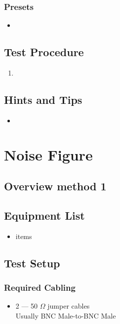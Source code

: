 \documentclass[10pt,letterpaper]{book}
\begin{document}
\subsubsection*{Presets}
\begin{itemize}
	\item
\end{itemize}
\subsection*{Test Procedure}
\begin{enumerate}
	\item  
\end{enumerate}

\subsection*{Hints and Tips}
\begin{itemize}
	\item
\end{itemize}


\section{Noise Figure}
\subsection*{Overview method 1}
\subsection*{Equipment List}
\begin{itemize}
	\item items
\end{itemize}
\subsection*{Test Setup}
\subsubsection*{Required Cabling}
\begin{itemize}
	\item 2 --- 50 $\Omega$ jumper cables \\
		Usually BNC Male-to-BNC Male
\end{itemize}
\end{document}
